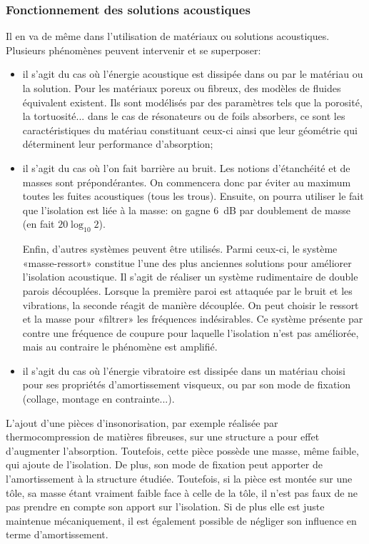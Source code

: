 \subsubsection{Fonctionnement des solutions acoustiques}

Il en va de même dans l'utilisation de matériaux ou solutions acoustiques. Plusieurs phénomènes peuvent intervenir et se superposer:
\begin{itemize}
   \item {} il s'agit du cas où l'énergie acoustique est dissipée dans ou par le matériau ou la solution. Pour les matériaux poreux ou fibreux, des modèles de fluides équivalent existent. Ils sont modélisés par des paramètres tels que la porosité, la tortuosité... dans le cas de résonateurs ou de foils absorbers, ce sont les caractéristiques du matériau constituant ceux-ci ainsi que leur géométrie qui déterminent leur performance d'absorption;
   \item {} il s'agit du cas où l'on fait barrière au bruit. Les notions d'étanchéité et de masses sont prépondérantes. On commencera donc par éviter au maximum toutes les fuites acoustiques (tous les trous). Ensuite, on pourra utiliser le fait que l'isolation est liée à la masse: on gagne 6~dB par doublement de masse (en fait $20\log_{10}2$).

Enfin, d'autres systèmes peuvent être utilisés. Parmi ceux-ci, le système «masse-ressort» constitue l'une des plus anciennes solutions pour améliorer l'isolation acoustique. Il s'agit de réaliser un système rudimentaire de double parois découplées. Lorsque la première paroi est attaquée par le bruit et les vibrations, la seconde réagit de manière découplée. On peut choisir le ressort et la masse pour «filtrer» les fréquences indésirables. Ce système présente par contre une fréquence de coupure pour laquelle l'isolation n'est pas améliorée, mais au contraire le phénomène est amplifié.
   
   \item {} il s'agit du cas où l'énergie vibratoire est dissipée dans un matériau choisi pour ses propriétés d'amortissement visqueux, ou par son mode de fixation (collage, montage en contrainte...).
\end{itemize}
L'ajout d'une pièces d'insonorisation, par exemple réalisée par thermocompression de matières fibreuses, sur une structure a pour effet d'augmenter l'absorption. Toutefois, cette pièce possède une masse, même faible, qui ajoute de l'isolation. De plus, son mode de fixation peut apporter de l'amortissement à la structure étudiée. Toutefois, si la pièce est montée sur une tôle, sa masse étant vraiment faible face à celle de la tôle, il n'est pas faux de ne pas prendre en compte son apport sur l'isolation. Si de plus elle est juste maintenue mécaniquement, il est également possible de négliger son influence en terme d'amortissement.

